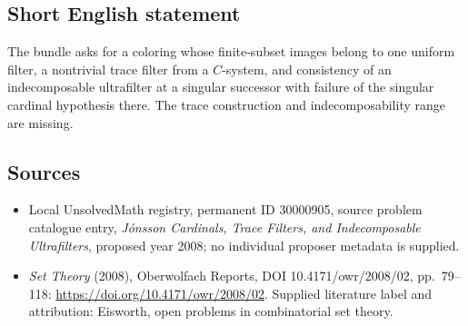 \documentclass[11pt]{article}
\begin{document}
\subsection{Short English statement}
The bundle asks for a coloring whose finite-subset images belong to one uniform filter, a nontrivial trace filter from a $C$-system, and consistency of an indecomposable ultrafilter at a singular successor with failure of the singular cardinal hypothesis there. The trace construction and indecomposability range are missing.
\subsection{Sources}
\begin{itemize}\item Local UnsolvedMath registry, permanent ID 30000905, source problem catalogue entry, \emph{J\'onsson Cardinals, Trace Filters, and Indecomposable Ultrafilters}, proposed year 2008; no individual proposer metadata is supplied.\item \emph{Set Theory} (2008), Oberwolfach Reports, DOI 10.4171/owr/2008/02, pp.\ 79--118: \url{https://doi.org/10.4171/owr/2008/02}. Supplied literature label and attribution: Eisworth, open problems in combinatorial set theory.\end{itemize}
\end{document}
